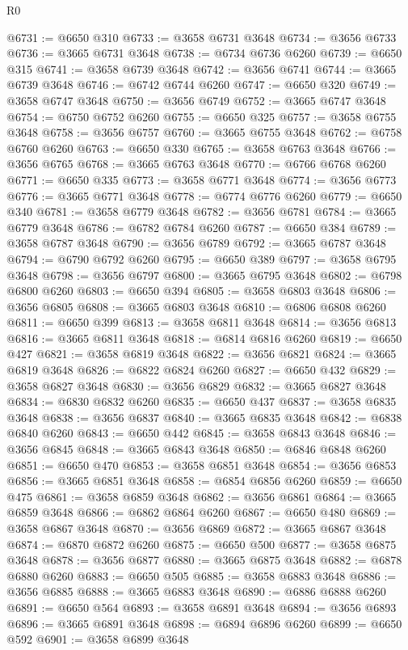 \begin{lexlean}{R0}
\begin{coremodule}
@6731 := @6650 @310
@6733 := @3658 @6731 @3648
@6734 := @3656 @6733
@6736 := @3665 @6731 @3648
@6738 := @6734 @6736 @6260
@6739 := @6650 @315
@6741 := @3658 @6739 @3648
@6742 := @3656 @6741
@6744 := @3665 @6739 @3648
@6746 := @6742 @6744 @6260
@6747 := @6650 @320
@6749 := @3658 @6747 @3648
@6750 := @3656 @6749
@6752 := @3665 @6747 @3648
@6754 := @6750 @6752 @6260
@6755 := @6650 @325
@6757 := @3658 @6755 @3648
@6758 := @3656 @6757
@6760 := @3665 @6755 @3648
@6762 := @6758 @6760 @6260
@6763 := @6650 @330
@6765 := @3658 @6763 @3648
@6766 := @3656 @6765
@6768 := @3665 @6763 @3648
@6770 := @6766 @6768 @6260
@6771 := @6650 @335
@6773 := @3658 @6771 @3648
@6774 := @3656 @6773
@6776 := @3665 @6771 @3648
@6778 := @6774 @6776 @6260
@6779 := @6650 @340
@6781 := @3658 @6779 @3648
@6782 := @3656 @6781
@6784 := @3665 @6779 @3648
@6786 := @6782 @6784 @6260
@6787 := @6650 @384
@6789 := @3658 @6787 @3648
@6790 := @3656 @6789
@6792 := @3665 @6787 @3648
@6794 := @6790 @6792 @6260
@6795 := @6650 @389
@6797 := @3658 @6795 @3648
@6798 := @3656 @6797
@6800 := @3665 @6795 @3648
@6802 := @6798 @6800 @6260
@6803 := @6650 @394
@6805 := @3658 @6803 @3648
@6806 := @3656 @6805
@6808 := @3665 @6803 @3648
@6810 := @6806 @6808 @6260
@6811 := @6650 @399
@6813 := @3658 @6811 @3648
@6814 := @3656 @6813
@6816 := @3665 @6811 @3648
@6818 := @6814 @6816 @6260
@6819 := @6650 @427
@6821 := @3658 @6819 @3648
@6822 := @3656 @6821
@6824 := @3665 @6819 @3648
@6826 := @6822 @6824 @6260
@6827 := @6650 @432
@6829 := @3658 @6827 @3648
@6830 := @3656 @6829
@6832 := @3665 @6827 @3648
@6834 := @6830 @6832 @6260
@6835 := @6650 @437
@6837 := @3658 @6835 @3648
@6838 := @3656 @6837
@6840 := @3665 @6835 @3648
@6842 := @6838 @6840 @6260
@6843 := @6650 @442
@6845 := @3658 @6843 @3648
@6846 := @3656 @6845
@6848 := @3665 @6843 @3648
@6850 := @6846 @6848 @6260
@6851 := @6650 @470
@6853 := @3658 @6851 @3648
@6854 := @3656 @6853
@6856 := @3665 @6851 @3648
@6858 := @6854 @6856 @6260
@6859 := @6650 @475
@6861 := @3658 @6859 @3648
@6862 := @3656 @6861
@6864 := @3665 @6859 @3648
@6866 := @6862 @6864 @6260
@6867 := @6650 @480
@6869 := @3658 @6867 @3648
@6870 := @3656 @6869
@6872 := @3665 @6867 @3648
@6874 := @6870 @6872 @6260
@6875 := @6650 @500
@6877 := @3658 @6875 @3648
@6878 := @3656 @6877
@6880 := @3665 @6875 @3648
@6882 := @6878 @6880 @6260
@6883 := @6650 @505
@6885 := @3658 @6883 @3648
@6886 := @3656 @6885
@6888 := @3665 @6883 @3648
@6890 := @6886 @6888 @6260
@6891 := @6650 @564
@6893 := @3658 @6891 @3648
@6894 := @3656 @6893
@6896 := @3665 @6891 @3648
@6898 := @6894 @6896 @6260
@6899 := @6650 @592
@6901 := @3658 @6899 @3648

\end{coremodule}
\end{lexlean}
